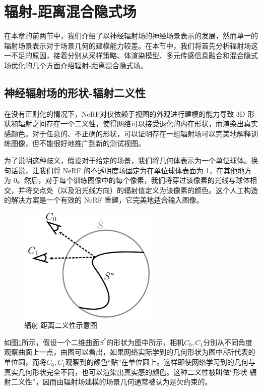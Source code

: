 \newpage
\section{辐射-距离混合隐式场}
\label{sec: related-work density-distance fields}
在本章的前两节中，我们介绍了以神经辐射场的神经场景表示的发展，然而单一的辐射场景表示对于场景几何的建模能力较差。在本节中，我们将首先分析辐射场这一不足的原因，接着分别从采样策略、体渲染模型、多元传感信息融合和混合隐式场优化的几个方面介绍辐射-距离混合隐式场。

\subsection{神经辐射场的形状-辐射二义性}
在没有正则化的情况下，NeRF\cite{mildenhall_nerf_2020}对仅依赖于视图的外观进行建模的能力导致 3D 形状和辐射之间存在一个二义性，使得网络可以接受退化的内在形状，而渲染出真实感颜色。对于任意的、不正确的形状，可以证明存在一组辐射场可以完美地解释训练图像，但不能很好地推广到新的测试视图。

为了说明这种歧义，假设对于给定的场景，我们将几何体表示为一个单位球体。换句话说，让我们将 NeRF 的不透明度场固定为在单位球体表面为 1，在其他地方为 0。然后，对于每个训练图像中的每个像素，我们将穿过该像素的光线与球体相交，并将交点处（以及沿光线方向）的辐射值定义为该像素的颜色。这个人工构造的解决方案是一个有效的 NeRF 重建，它完美地适合输入图像。

\begin{figure}[h]
    \centering
    \includegraphics[width=0.6\textwidth]{undergraduate-thesis/images/shape-radiance ambiguity.png}
    \caption{辐射-距离二义性示意图\cite{zhang_nerf_2020}}
    \label{fig:related-work shape-radiance ambiguity}
\end{figure}

如图\ref{fig:related-work shape-radiance ambiguity}所示，假设一个二维曲面$S^*$的形状为图中所示，相机$C_0, C_1$分别从不同角度观察曲面上一点，由图可以看出，如果网络实际学到的几何形状为图中$\hat{S}$所代表的单位圆，而将$C_0, C_1$观察到的颜色“贴”在单位圆上。这样即使网络学习到的几何与真实几何形状完全不同，也可以渲染出真实感的颜色。这种二义性被叫做“形状-辐射二义性”\cite{zhang_nerf_2020}，因而由辐射场建模的场景几何通常被认为是欠约束的。

